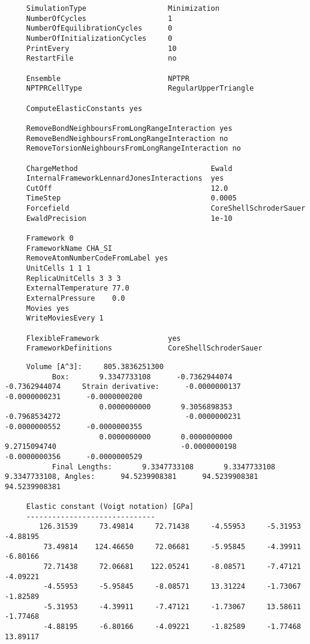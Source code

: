 \begin{tiny}
\begin{verbatim}
     SimulationType                   Minimization
     NumberOfCycles                   1
     NumberOfEquilibrationCycles      0
     NumberOfInitializationCycles     0
     PrintEvery                       10
     RestartFile                      no

     Ensemble                         NPTPR
     NPTPRCellType                    RegularUpperTriangle

     ComputeElasticConstants yes

     RemoveBondNeighboursFromLongRangeInteraction yes
     RemoveBendNeighboursFromLongRangeInteraction no
     RemoveTorsionNeighboursFromLongRangeInteraction no

     ChargeMethod                               Ewald
     InternalFrameworkLennardJonesInteractions  yes
     CutOff                                     12.0
     TimeStep                                   0.0005
     Forcefield                                 CoreShellSchroderSauer
     EwaldPrecision                             1e-10

     Framework 0
     FrameworkName CHA_SI
     RemoveAtomNumberCodeFromLabel yes
     UnitCells 1 1 1
     ReplicaUnitCells 3 3 3
     ExternalTemperature 77.0
     ExternalPressure    0.0
     Movies yes
     WriteMoviesEvery 1

     FlexibleFramework                yes
     FrameworkDefinitions             CoreShellSchroderSauer
\end{verbatim}
\end{tiny}

\begin{tiny}
\begin{verbatim}
     Volume [A^3]:     805.3836251300
           Box:       9.3347733108      -0.7362944074      -0.7362944074     Strain derivative:      -0.0000000137      -0.0000000231      -0.0000000200
                      0.0000000000       9.3056898353      -0.7968534272                             -0.0000000231      -0.0000000552      -0.0000000355
                      0.0000000000       0.0000000000       9.2715094740                             -0.0000000198      -0.0000000356      -0.0000000529
           Final Lengths:       9.3347733108       9.3347733108       9.3347733108, Angles:      94.5239908381      94.5239908381      94.5239908381

     Elastic constant (Voigt notation) [GPa]
     ------------------------------
        126.31539     73.49814     72.71438     -4.55953     -5.31953     -4.88195
         73.49814    124.46650     72.06681     -5.95845     -4.39911     -6.80166
         72.71438     72.06681    122.05241     -8.08571     -7.47121     -4.09221
         -4.55953     -5.95845     -8.08571     13.31224     -1.73067     -1.82589
         -5.31953     -4.39911     -7.47121     -1.73067     13.58611     -1.77468
         -4.88195     -6.80166     -4.09221     -1.82589     -1.77468     13.89117
\end{verbatim}
\end{tiny}

